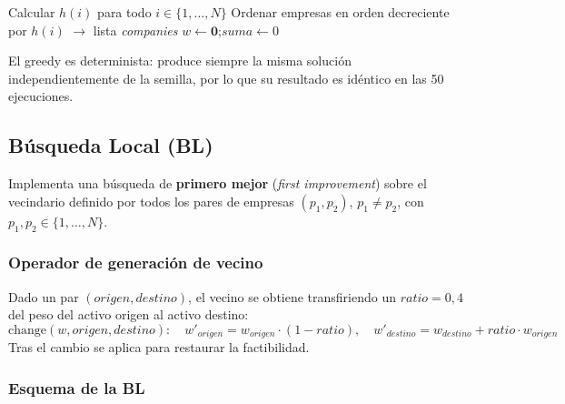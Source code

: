 \documentclass[12pt,a4paper]{article}
\begin{document}
\begin{algorithm}[H]
\caption{Greedy}
Calcular $h(i)$ para todo $i \in \{1,\ldots,N\}$\;
Ordenar empresas en orden decreciente por $h(i)$ $\rightarrow$ lista \textit{companies}\;
$w \leftarrow \mathbf{0}$;\quad $suma \leftarrow 0$\;
\end{algorithm}

\noindent El greedy es determinista: produce siempre la misma solución independientemente
de la semilla, por lo que su resultado es idéntico en las 50 ejecuciones.

\subsection{Búsqueda Local (BL)}

Implementa una búsqueda de \textbf{primero mejor} (\textit{first improvement})
sobre el vecindario definido por todos los pares de empresas $(p_1, p_2)$,
$p_1 \neq p_2$, con $p_1, p_2 \in \{1,\ldots,N\}$.

\subsubsection*{Operador de generación de vecino}

Dado un par $(origen, destino)$, el vecino se obtiene transfiriendo un
$ratio = 0{,}4$ del peso del activo origen al activo destino:
\[
  \text{change}(w, origen, destino) : \quad
  w'_{origen} = w_{origen} \cdot (1 - ratio),\quad
  w'_{destino} = w_{destino} + ratio \cdot w_{origen}
\]
Tras el cambio se aplica \fix{} para restaurar la factibilidad.

\subsubsection*{Esquema de la BL}
\end{document}

